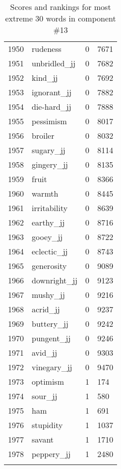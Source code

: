 \begin{longtable}[!htbp]{| rlr@{.}l |}
    1950 & rudeness & 0 & 7671 \\
    1951 & unbridled\_jj & 0 & 7682 \\
    1952 & kind\_jj & 0 & 7692 \\
    1953 & ignorant\_jj & 0 & 7882 \\
    1954 & die-hard\_jj & 0 & 7888 \\
    1955 & pessimism & 0 & 8017 \\
    1956 & broiler & 0 & 8032 \\
    1957 & sugary\_jj & 0 & 8114 \\
    1958 & gingery\_jj & 0 & 8135 \\
    1959 & fruit & 0 & 8366 \\
    1960 & warmth & 0 & 8445 \\
    1961 & irritability & 0 & 8639 \\
    1962 & earthy\_jj & 0 & 8716 \\
    1963 & gooey\_jj & 0 & 8722 \\
    1964 & eclectic\_jj & 0 & 8743 \\
    1965 & generosity & 0 & 9089 \\
    1966 & downright\_jj & 0 & 9123 \\
    1967 & mushy\_jj & 0 & 9216 \\
    1968 & acrid\_jj & 0 & 9237 \\
    1969 & buttery\_jj & 0 & 9242 \\
    1970 & pungent\_jj & 0 & 9246 \\
    1971 & avid\_jj & 0 & 9303 \\
    1972 & vinegary\_jj & 0 & 9470 \\
    1973 & optimism & 1 & 174 \\
    1974 & sour\_jj & 1 & 580 \\
    1975 & ham & 1 & 691 \\
    1976 & stupidity & 1 & 1037 \\
    1977 & savant & 1 & 1710 \\
    1978 & peppery\_jj & 1 & 2480 \\
    \hline
    \caption{Scores and rankings for most extreme 30 words in component \#13} \\
\end{longtable}
